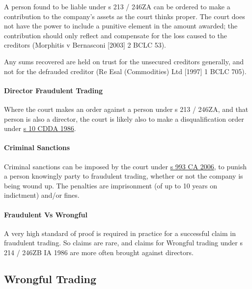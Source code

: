 \documentclass[
]{article}
\begin{document}
A person found to be liable under s 213 / 246ZA can be ordered to make a
contribution to the company's assets as the court thinks proper. The
court does not have the power to include a punitive element in the
amount awarded; the contribution should only reflect and compensate for
the loss caused to the creditors (Morphitis v Bernasconi {[}2003{]} 2
BCLC 53).

Any sums recovered are held on trust for the unsecured creditors
generally, and not for the defrauded creditor (Re Esal (Commodities) Ltd
{[}1997{]} 1 BCLC 705).

\hypertarget{director-fraudulent-trading}{%
\paragraph{Director Fraudulent
Trading}\label{director-fraudulent-trading}}

Where the court makes an order against a person under s 213 / 246ZA, and
that person is also a director, the court is likely also to make a
disqualification order under
\href{https://www.legislation.gov.uk/ukpga/1986/46/section/10}{s 10 CDDA
1986}.

\hypertarget{criminal-sanctions}{%
\paragraph{Criminal Sanctions}\label{criminal-sanctions}}

Criminal sanctions can be imposed by the court under
\href{https://www.legislation.gov.uk/ukpga/2006/46/section/993}{s 993 CA
2006}, to punish a person knowingly party to fraudulent trading, whether
or not the company is being wound up. The penalties are imprisonment (of
up to 10 years on indictment) and/or fines.

\hypertarget{fraudulent-vs-wrongful}{%
\paragraph{Fraudulent Vs Wrongful}\label{fraudulent-vs-wrongful}}

A very high standard of proof is required in practice for a successful
claim in fraudulent trading. So claims are rare, and claims for Wrongful
trading under s 214 / 246ZB IA 1986 are more often brought against
directors.

\hypertarget{wrongful-trading}{%
\subsection{Wrongful Trading}\label{wrongful-trading}}
\end{document}
